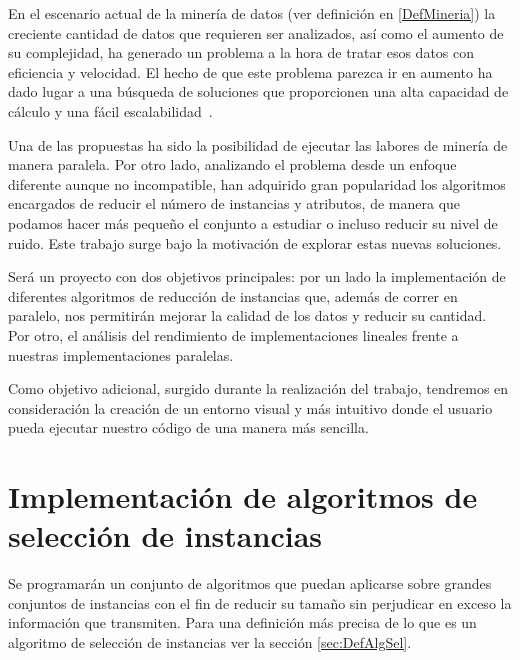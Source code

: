 \label{ChapObjetivos}


En el escenario actual de la minería de datos (ver definición en \ref{DefMineria}) la creciente cantidad de datos que requieren ser analizados, así como el aumento de su complejidad,  ha generado un problema a la hora de tratar esos datos con eficiencia y velocidad. El hecho de que este problema parezca ir en aumento ha dado lugar a una búsqueda de soluciones que proporcionen una alta capacidad de cálculo y una fácil escalabilidad~\cite{DataMiningConcepts}. 

Una de las propuestas ha sido la posibilidad de ejecutar las labores de minería de manera paralela. Por otro lado, analizando el problema desde un enfoque diferente aunque no incompatible, han adquirido gran popularidad los algoritmos encargados de reducir el número de instancias y atributos, de manera que podamos hacer más pequeño el conjunto a estudiar o incluso reducir su nivel de ruido. Este trabajo surge bajo la motivación de explorar estas nuevas soluciones. 

Será un proyecto con dos objetivos principales: por un lado la implementación de diferentes algoritmos de reducción de instancias que, además de correr en paralelo, nos permitirán mejorar la calidad de los datos y reducir su cantidad. Por otro, el análisis del rendimiento de implementaciones lineales frente a nuestras implementaciones paralelas.

Como objetivo adicional, surgido durante la realización del trabajo, tendremos en consideración la creación de un entorno visual y más intuitivo donde el usuario pueda ejecutar nuestro código de una manera más sencilla.

\section{Implementación de algoritmos de selección de instancias}

Se programarán un conjunto de algoritmos que puedan aplicarse sobre grandes conjuntos de instancias con el fin de reducir su tamaño sin perjudicar en exceso la información que transmiten. Para una definición más precisa de lo que es un algoritmo de selección de instancias ver la sección \ref{sec:DefAlgSel}.

